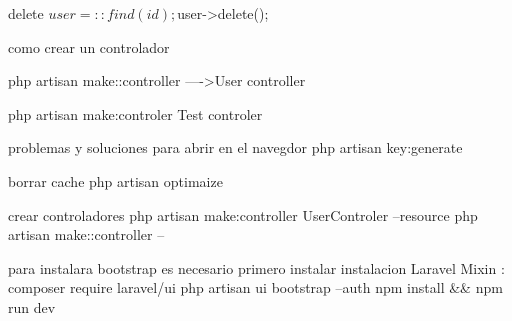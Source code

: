 delete
$user=::find(id);
$user->delete();


como crear un controlador 

php artisan make::controller  ---->User controller

php artisan make:controler  Test controler 




problemas  y soluciones para abrir en el navegdor
php artisan key:generate


borrar cache 
php artisan optimaize




crear controladores
php artisan make:controller  UserControler --resource
php artisan make::controller -- 



para instalara bootstrap es necesario primero instalar 
instalacion Laravel Mixin :
composer require laravel/ui
php artisan ui bootstrap --auth
npm install && npm run dev 
